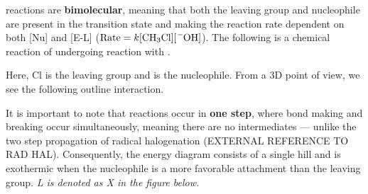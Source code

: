 \documentclass[10pt]{article}
\begin{document}
  \begin{core}{\snt}
    
    \snt reactions are \textbf{bimolecular}, meaning that both the leaving group and nucleophile are present in the transition state and making the reaction rate dependent on both [Nu] and [E-L] ($\text{Rate} = k[\ce{CH3Cl}][\ce{^-OH}]$). The following is a chemical reaction of  undergoing \snt reaction with .

    \vspace{15pt}

    Here, Cl is the leaving group and  is the nucleophile. From a 3D point of view, we see the following outline interaction.


    It is important to note that \snt reactions occur in \textbf{one step}, where bond making and breaking occur simultaneously, meaning there are no intermediates --- unlike the two step propagation of radical halogenation (EXTERNAL REFERENCE TO RAD HAL). Consequently, the energy diagram consists of a single hill and is exothermic when the nucleophile is a more favorable attachment than the leaving group. \textit{L is denoted as X in the figure below.}


\end{core}
\end{document}
